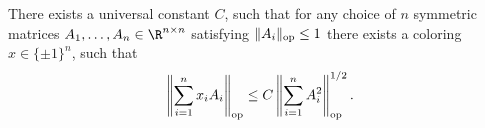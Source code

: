 There exists a universal constant $C$, such that for any choice of $n$ symmetric matrices $A_1,\ldots,A_n\in\R^{n\times n}$ satisfying $\|A_i\|_{\rm op}\le1$ there exists a coloring $x\in\{\pm1\}^n$, such that
\[\left\|\sum_{i=1}^nx_iA_i\right\|_{\rm op}\le C\left\|\sum_{i=1}^nA_i^2\right\|_{\rm op}^{1/2}.\]
